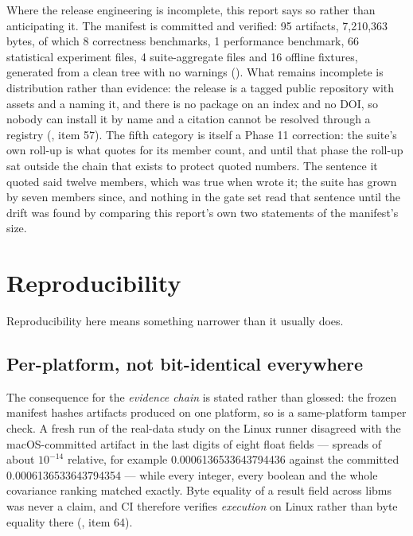 \documentclass[11pt,a4paper]{article}
\begin{document}
Where the release engineering is incomplete, this report says so rather than anticipating it.
The manifest is committed and verified: 95 artifacts, 7{,}210{,}363 bytes, of which 8 correctness
benchmarks, 1 performance benchmark, 66 statistical experiment files, 4 suite-aggregate files and 16
offline fixtures, generated from a clean tree with no warnings
(). What remains incomplete is distribution rather than evidence: the
release is a tagged public repository with assets and a  naming it, and there is
no package on an index and no DOI, so nobody can install it by name and a citation cannot be resolved
through a registry (, item 57). The fifth category is itself a Phase 11
correction: the suite's own roll-up is what  quotes for its member count, and until that
phase the roll-up sat outside the chain that exists to protect quoted numbers. The sentence it quoted
said twelve members, which was true when 
wrote it; the suite has grown by seven members since, and nothing in the gate set read that sentence
until the drift was found by comparing this report's own two statements of the manifest's size.

\section{Reproducibility}
\label{sec:reproducibility}

Reproducibility here means something narrower than it usually does.

\subsection{Per-platform, not bit-identical everywhere}
The consequence for the \emph{evidence chain} is stated rather than glossed: the frozen manifest
hashes artifacts produced on one platform, so  is a
same-platform tamper check. A fresh run of the real-data study on the Linux runner disagreed with the
macOS-committed artifact in the last digits of eight float fields --- spreads of about
$10^{-14}$ relative, for example 0.0006136533643794436 against the committed
0.0006136533643794354 --- while every integer, every boolean and the whole covariance ranking
matched exactly. Byte equality of a result field across libms was never a claim, and CI
therefore verifies \emph{execution} on Linux rather than byte equality there
(, item 64).
\end{document}
